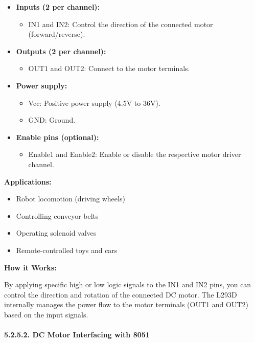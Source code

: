 \documentclass[
]{article}
\begin{document}
\begin{itemize}
\item
  \textbf{Inputs (2 per channel):}

  \begin{itemize}
  \item
    IN1 and IN2: Control the direction of the connected motor
    (forward/reverse).
  \end{itemize}
\item
  \textbf{Outputs (2 per channel):}

  \begin{itemize}
  \item
    OUT1 and OUT2: Connect to the motor terminals.
  \end{itemize}
\item
  \textbf{Power supply:}

  \begin{itemize}
  \item
    Vcc: Positive power supply (4.5V to 36V).
  \item
    GND: Ground.
  \end{itemize}
\item
  \textbf{Enable pins (optional):}

  \begin{itemize}
  \item
    Enable1 and Enable2: Enable or disable the respective motor driver
    channel.
  \end{itemize}
\end{itemize}

\textbf{Applications:}

\begin{itemize}
\item
  Robot locomotion (driving wheels)
\item
  Controlling conveyor belts
\item
  Operating solenoid valves
\item
  Remote-controlled toys and cars
\end{itemize}

\textbf{How it Works:}

By applying specific high or low logic signals to the IN1 and IN2 pins,
you can control the direction and rotation of the connected DC motor.
The L293D internally manages the power flow to the motor terminals (OUT1
and OUT2) based on the input signals.

\hypertarget{5252-dc-motor-interfacing-with-8051}{%
\paragraph{5.2.5.2. DC Motor Interfacing with
8051}\label{5252-dc-motor-interfacing-with-8051}}
\end{document}

